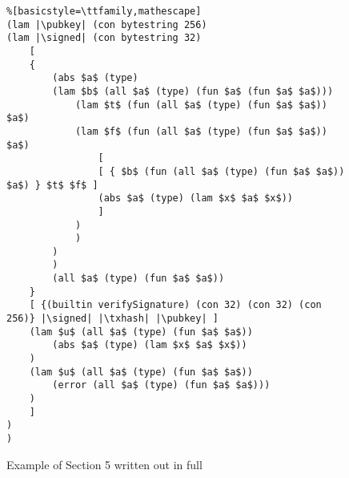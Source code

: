 \documentclass[../plutus-core-specification.tex]{subfiles}
\begin{document}



\begin{figure*}[h]  %
\begin{lstlisting}%[basicstyle=\ttfamily,mathescape]
(lam |\pubkey| (con bytestring 256)
(lam |\signed| (con bytestring 32)
    [ 
    {
        (abs $a$ (type)
        (lam $b$ (all $a$ (type) (fun $a$ (fun $a$ $a$)))
            (lam $t$ (fun (all $a$ (type) (fun $a$ $a$)) $a$)
            (lam $f$ (fun (all $a$ (type) (fun $a$ $a$)) $a$)
                [
                [ { $b$ (fun (all $a$ (type) (fun $a$ $a$)) $a$) } $t$ $f$ ]
                (abs $a$ (type) (lam $x$ $a$ $x$))
                ]
            )
            )
        )
        )
        (all $a$ (type) (fun $a$ $a$))
    }
    [ {(builtin verifySignature) (con 32) (con 32) (con 256)} |\signed| |\txhash| |\pubkey| ]
    (lam $u$ (all $a$ (type) (fun $a$ $a$))
        (abs $a$ (type) (lam $x$ $a$ $x$))
    )
    (lam $u$ (all $a$ (type) (fun $a$ $a$))
        (error (all $a$ (type) (fun $a$ $a$)))
    )
    ]
)
)
\end{lstlisting}
\caption{Example of Section 5 written out in full}
\label{fig:Continuized_Let_Example}
\end{figure*}
\end{document}
